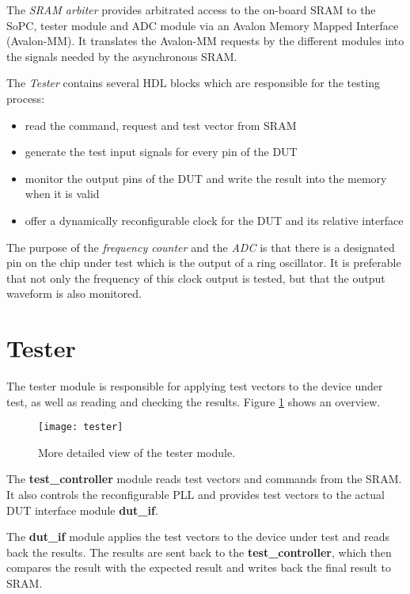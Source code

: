 The \textit{SRAM arbiter} provides arbitrated access to the on-board SRAM to the SoPC, tester module and ADC module via
an Avalon Memory Mapped Interface (Avalon-MM). It translates the Avalon-MM requests by the different modules into
the signals needed by the asynchronous SRAM.

The \textit{Tester} contains several HDL blocks which are responsible for the testing process:
\begin{itemize}
 \item read the command, request and test vector from SRAM
 \item generate the test input signals for every pin of the DUT
 \item monitor the output pins of the DUT and write the result into the memory when it is valid
 \item offer a dynamically reconfigurable clock for the DUT and its relative interface
\end{itemize}

The purpose of the \textit{frequency counter} and the \textit{ADC} is that there is a designated
pin on the chip under test which is the output of a ring oscillator. It is preferable that not only
the frequency of this clock output is tested, but that the output waveform is also monitored.


\newpage
\section{Tester}
The tester module is responsible for applying test vectors to the device under test, as well as
reading and checking the results. Figure \ref{fig:tester} shows an overview.

\begin{figure}
 \centering
 \texttt{[image: tester]}
 \caption{More detailed view of the tester module.}
 \label{fig:tester}
\end{figure}

The \textbf{test\_controller} module reads test vectors and commands from the SRAM. It also controls
the reconfigurable PLL and provides test vectors to the actual DUT interface module \textbf{dut\_if}.

The \textbf{dut\_if} module applies the test vectors to the device under test and reads back the results.
The results are sent back to the \textbf{test\_controller}, which then compares the result with the
expected result and writes back the final result to SRAM.


